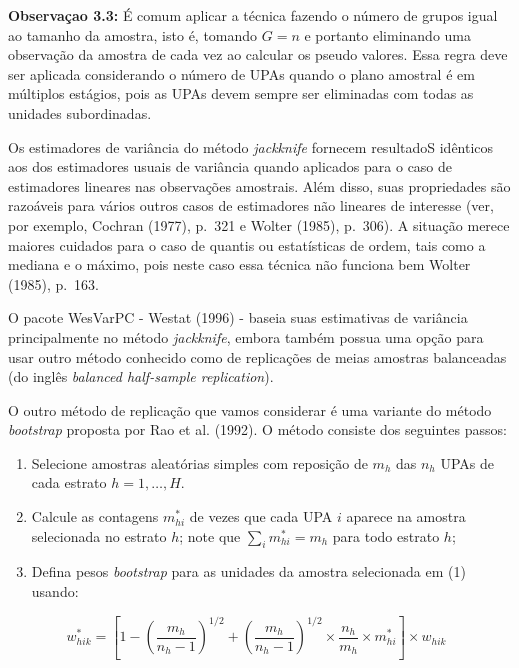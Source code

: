\documentclass[
  12pt,
  brazilian,
]{book}
\theoremstyle{definition}
\theoremstyle{definition}
\theoremstyle{definition}
\theoremstyle{definition}
\theoremstyle{remark}
\begin{document}
\textbf{Observaçao 3.3:} É comum aplicar a técnica fazendo o número de grupos igual ao tamanho da amostra, isto é, tomando \(G=n\) e portanto eliminando uma observação da amostra de cada vez ao calcular os pseudo valores. Essa regra deve ser aplicada considerando o número de UPAs quando o plano amostral é em múltiplos estágios, pois as UPAs devem sempre ser eliminadas com todas as unidades subordinadas.

Os estimadores de variância do método \emph{jackknife} fornecem resultadoS idênticos aos dos estimadores usuais de variância quando aplicados para o caso de estimadores lineares nas observações amostrais. Além disso, suas propriedades são razoáveis para vários outros casos de estimadores não lineares de interesse (ver, por exemplo, Cochran (1977), p.~321 e Wolter (1985), p.~306). A situação merece maiores cuidados para o caso de quantis ou estatísticas de ordem, tais como a mediana e o máximo, pois neste caso essa técnica não funciona bem Wolter (1985), p.~163.

O pacote WesVarPC - Westat (1996) - baseia suas estimativas de variância principalmente no método \emph{jackknife}, embora também possua uma opção para usar outro método conhecido como de replicações de meias amostras balanceadas (do inglês \emph{balanced half-sample replication}).

O outro método de replicação que vamos considerar é uma variante do método \emph{bootstrap} proposta por Rao et al. (1992). O método consiste dos seguintes passos:

\begin{enumerate}
\def\labelenumi{\arabic{enumi})}
\item
  Selecione amostras aleatórias simples com reposição de \(m_h\) das \(n_h\) UPAs de cada estrato \(h=1, \dots, H\).
\item
  Calcule as contagens \(m_{hi}^*\) de vezes que cada UPA \(i\) aparece na amostra selecionada no estrato \(h\); note que \(\sum_i m_{hi}^* = m_h\) para todo estrato \(h\);
\item
  Defina pesos \emph{bootstrap} para as unidades da amostra selecionada em (1) usando:
\end{enumerate}

\begin{equation}
 w_{hik}^* = \left[ 1 - \left( \frac{m_h} {n_h - 1} \right)^{1/2} +  \left( \frac{m_h} {n_h - 1} \right)^{1/2} \times \frac{n_h} {m_h} \times m_{hi}^* \right] \times w_{hik}  \,\,\, \label{eq:estpa29}
\end{equation}
\end{document}
